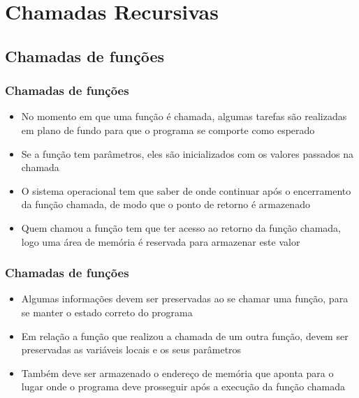 \section{Chamadas Recursivas}

\subsection{Chamadas de funções}

\begin{frame}

    \frametitle{Chamadas de funções}

    \begin{itemize}
        \item No momento em que uma função é {chamada}, algumas 
        {tarefas} são realizadas em plano de fundo para que o programa
        se comporte como esperado
        

        \item Se a função tem {parâmetros}, eles são
        {inicializados} com os valores passados na chamada 
        

        \item O {sistema operacional} tem que saber de onde 
        continuar após o encerramento da função chamada, de modo
        que o ponto de retorno é {armazenado}
        

        \item {Quem chamou} a função tem que ter {acesso} ao 
        retorno da função chamada, logo uma {área de memória} é
        reservada para armazenar este valor

    \end{itemize}

\end{frame}

\begin{frame}
    \frametitle{Chamadas de funções}

    \begin{itemize}
        \item Algumas {informações} devem ser {preservadas} ao        se chamar uma função, para se manter o {estado correto} do
        programa
        

        \item Em relação a função que {realizou} a chamada de um 
        outra função, devem ser preservadas as {variáveis locais} e 
        os seus {parâmetros} 
        

        \item Também deve ser armazenado o {endereço de memória} que 
        aponta para o lugar onde o programa deve {prosseguir} após a         {execução}  da função chamada

    \end{itemize}

\end{frame}

